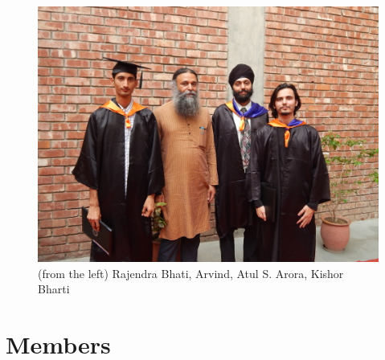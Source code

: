 \documentclass[11pt]{article}
\begin{document}
\begin{figure}[htb]
\centering
\includegraphics[width=.9\linewidth]{./images/DSCN0132.JPG}
\caption{\label{fig:convocation-2016}(from the left) Rajendra Bhati, Arvind, Atul S. Arora, Kishor Bharti}
\end{figure}

\section{Members}
\label{sec-2}
\end{document}
